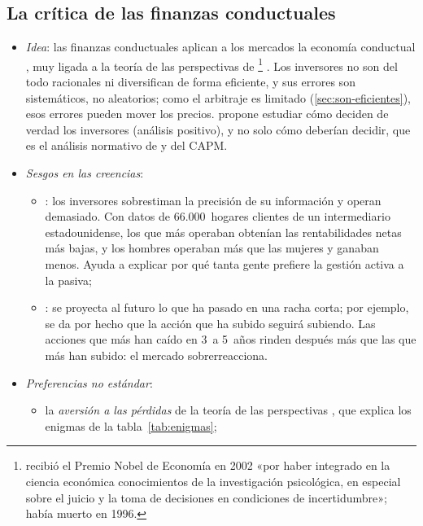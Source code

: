 \documentclass[11pt]{article}
\begin{document}
\subsection{La crítica de las finanzas conductuales}\label{sec:conductual}

\begin{itemize}
\item \emph{Idea}: las finanzas conductuales aplican a los mercados la economía conductual , muy ligada a la teoría de las perspectivas de \textcite{KahnemanTversky1979}\footnote{ recibió el Premio Nobel de Economía en 2002 «por haber integrado en la ciencia económica conocimientos de la investigación psicológica, en especial sobre el juicio y la toma de decisiones en condiciones de incertidumbre»\nocite{Nobel2002Kahneman};  había muerto en 1996.} . Los inversores no son del todo racionales ni diversifican de forma eficiente, y sus errores son sistemáticos, no aleatorios; como el arbitraje es limitado (\ref{sec:son-eficientes}), esos errores pueden mover los precios.  propone estudiar cómo deciden de verdad los inversores (análisis positivo), y no solo cómo deberían decidir, que es el análisis normativo de  y del CAPM.
\item \emph{Sesgos en las creencias}:
  \begin{itemize}
  \item {}: los inversores sobrestiman la precisión de su información y operan demasiado. Con datos de 66.000~hogares clientes de un intermediario estadounidense, los que más operaban obtenían las rentabilidades netas más bajas\nocite{BarberOdean2000}, y los hombres operaban más que las mujeres y ganaban menos\nocite{BarberOdean2001}. Ayuda a explicar por qué tanta gente prefiere la gestión activa a la pasiva;
  \item {}: se proyecta al futuro lo que ha pasado en una racha corta; por ejemplo, se da por hecho que la acción que ha subido seguirá subiendo. Las acciones que más han caído en 3~a 5~años rinden después más que las que más han subido\nocite{DeBondtThaler1985}: el mercado sobrerreacciona\nocite{BarberisShleiferVishny1998}.
  \end{itemize}
\item \emph{Preferencias no estándar}:
  \begin{itemize}
  \item la \emph{aversión a las pérdidas} de la teoría de las perspectivas , que explica los enigmas de la tabla~\ref{tab:enigmas};

\end{itemize}
\end{itemize}
\end{document}
